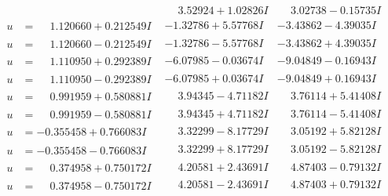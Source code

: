 \documentclass[1p]{elsarticle_modified}
\theoremstyle{definition}
\begin{document}
$$\begin{array}{c|c|c}
 & \phantom{-}3.52924 + 1.02826 I & \phantom{-}3.02738 - 0.15735 I \\ \hline\begin{aligned}
u &= \phantom{-}1.120660 + 0.212549 I\end{aligned}
 & -1.32786 + 5.57768 I & -3.43862 - 4.39035 I \\ \hline\begin{aligned}
u &= \phantom{-}1.120660 - 0.212549 I\end{aligned}
 & -1.32786 - 5.57768 I & -3.43862 + 4.39035 I \\ \hline\begin{aligned}
u &= \phantom{-}1.110950 + 0.292389 I\end{aligned}
 & -6.07985 - 0.03674 I & -9.04849 - 0.16943 I \\ \hline\begin{aligned}
u &= \phantom{-}1.110950 - 0.292389 I\end{aligned}
 & -6.07985 + 0.03674 I & -9.04849 + 0.16943 I \\ \hline\begin{aligned}
u &= \phantom{-}0.991959 + 0.580881 I\end{aligned}
 & \phantom{-}3.94345 - 4.71182 I & \phantom{-}3.76114 + 5.41408 I \\ \hline\begin{aligned}
u &= \phantom{-}0.991959 - 0.580881 I\end{aligned}
 & \phantom{-}3.94345 + 4.71182 I & \phantom{-}3.76114 - 5.41408 I \\ \hline\begin{aligned}
u &= -0.355458 + 0.766083 I\end{aligned}
 & \phantom{-}3.32299 - 8.17729 I & \phantom{-}3.05192 + 5.82128 I \\ \hline\begin{aligned}
u &= -0.355458 - 0.766083 I\end{aligned}
 & \phantom{-}3.32299 + 8.17729 I & \phantom{-}3.05192 - 5.82128 I \\ \hline\begin{aligned}
u &= \phantom{-}0.374958 + 0.750172 I\end{aligned}
 & \phantom{-}4.20581 + 2.43691 I & \phantom{-}4.87403 - 0.79132 I \\ \hline\begin{aligned}
u &= \phantom{-}0.374958 - 0.750172 I\end{aligned}
 & \phantom{-}4.20581 - 2.43691 I & \phantom{-}4.87403 + 0.79132 I \\ \hline\begin{aligned}

\end{aligned}
\end{array}$$
\end{document}
